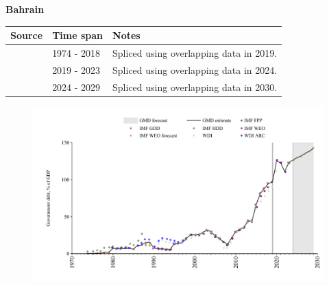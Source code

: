 \documentclass[12pt,a4paper,landscape]{article}
\begin{document}
\begin{adjustbox}{max totalsize={\paperwidth}{\paperheight},center}
\begin{minipage}[t][\textheight][t]{\textwidth}
\vspace*{0.5cm}
{}
\begin{center}
{\Large\bfseries Bahrain}
\end{center}
\vspace{0.5cm}
\begin{table}[H]
\centering
\small
\begin{tabular}{|l|l|l|}
\hline
\textbf{Source} & \textbf{Time span} & \textbf{Notes} \\
\hline
\rowcolor{white}\cite{IMF_GDD}& 1974 - 2018 &Spliced using overlapping data in 2019.\\
\rowcolor{lightgray}\cite{IMF_FPP}& 2019 - 2023 &Spliced using overlapping data in 2024.\\
\rowcolor{white}\cite{IMF_WEO_forecast}& 2024 - 2029 &Spliced using overlapping data in 2030.\\
\hline
\end{tabular}
\end{table}
\begin{figure}[H]
\centering
\includegraphics[width=\textwidth,height=0.6\textheight,keepaspectratio]{graphs/BHR_govdebt_GDP.pdf}
\end{figure}
\end{minipage}
\end{adjustbox}
\end{document}
